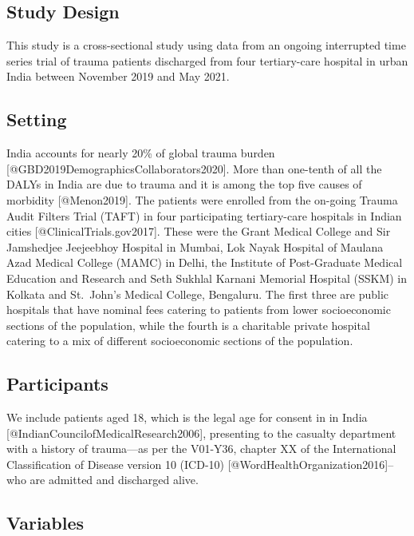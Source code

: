 \documentclass[
]{article}
\begin{document}
\hypertarget{study-design}{%
\subsection{Study Design}\label{study-design}}

This study is a cross-sectional study using data from an ongoing
interrupted time series trial of trauma patients discharged from four
tertiary-care hospital in urban India between November 2019 and May
2021.

\hypertarget{setting}{%
\subsection{Setting}\label{setting}}

India accounts for nearly 20\% of global trauma burden
{[}@GBD2019DemographicsCollaborators2020{]}. More than one-tenth of all
the DALYs in India are due to trauma and it is among the top five causes
of morbidity {[}@Menon2019{]}. The patients were enrolled from the
on-going Trauma Audit Filters Trial (TAFT) in four participating
tertiary-care hospitals in Indian cities {[}@ClinicalTrials.gov2017{]}.
These were the Grant Medical College and Sir Jamshedjee Jeejeebhoy
Hospital in Mumbai, Lok Nayak Hospital of Maulana Azad Medical College
(MAMC) in Delhi, the Institute of Post-Graduate Medical Education and
Research and Seth Sukhlal Karnani Memorial Hospital (SSKM) in Kolkata
and St.~John's Medical College, Bengaluru. The first three are public
hospitals that have nominal fees catering to patients from lower
socioeconomic sections of the population, while the fourth is a
charitable private hospital catering to a mix of different socioeconomic
sections of the population.

\hypertarget{participants}{%
\subsection{Participants}\label{participants}}

We include patients aged 18, which is the legal age for consent in in
India {[}@IndianCouncilofMedicalResearch2006{]}, presenting to the
casualty department with a history of trauma---as per the V01-Y36,
chapter XX of the International Classification of Disease version 10
(ICD-10) {[}@WordHealthOrganization2016{]}--who are admitted and
discharged alive.

\hypertarget{variables}{%
\subsection{Variables}\label{variables}}
\end{document}
